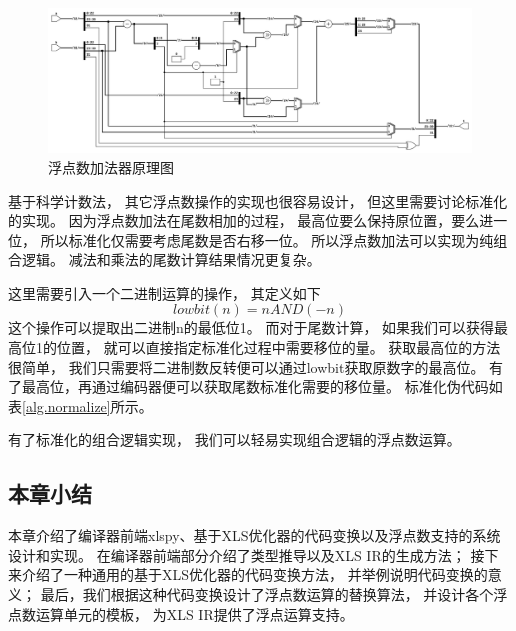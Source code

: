 \begin{figure}[h]
\centering
\includegraphics[width=\linewidth]{figure/float_add.png}
\caption{浮点数加法器原理图}
\label{fig:float_add}
\end{figure}

基于科学计数法，
其它浮点数操作的实现也很容易设计，
但这里需要讨论标准化的实现。
因为浮点数加法在尾数相加的过程，
最高位要么保持原位置，要么进一位，
所以标准化仅需要考虑尾数是否右移一位。
所以浮点数加法可以实现为纯组合逻辑。
减法和乘法的尾数计算结果情况更复杂。

这里需要引入一个二进制运算的操作，
其定义如下
$$lowbit(n) = n AND (-n)$$
这个操作可以提取出二进制n的最低位1。
而对于尾数计算，
如果我们可以获得最高位1的位置，
就可以直接指定标准化过程中需要移位的量。
获取最高位的方法很简单，
我们只需要将二进制数反转便可以通过lowbit获取原数字的最高位。
有了最高位，再通过编码器便可以获取尾数标准化需要的移位量。
标准化伪代码如表\ref{alg.normalize}所示。

有了标准化的组合逻辑实现，
我们可以轻易实现组合逻辑的浮点数运算。

\subsection{本章小结}

本章介绍了编译器前端xlspy、基于XLS优化器的代码变换以及浮点数支持的系统设计和实现。
在编译器前端部分介绍了类型推导以及XLS IR的生成方法；
接下来介绍了一种通用的基于XLS优化器的代码变换方法，
并举例说明代码变换的意义；
最后，我们根据这种代码变换设计了浮点数运算的替换算法，
并设计各个浮点数运算单元的模板，
为XLS IR提供了浮点运算支持。